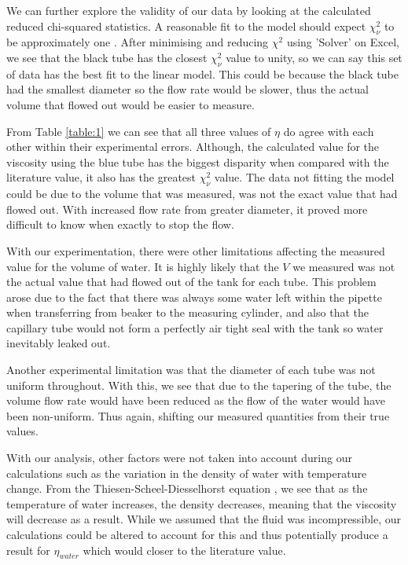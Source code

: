 \documentclass[twocolumn]{revtex4}
\begin{document}
We can further explore the validity of our data by looking at the calculated reduced chi-squared statistics. A reasonable fit to the model should expect $\chi^2_{\nu}$ to be approximately one \cite{hughesandhayes}. After minimising and reducing $\chi^2$ using 'Solver' on Excel, we see that the black tube has the closest $\chi^2_{\nu}$ value to unity, so we can say this set of data has the best fit to the linear model. This could be because the black tube had the smallest diameter so the flow rate would be slower, thus the actual volume that flowed out would be easier to measure.

From Table \ref{table:1} we can see that all three values of $\eta$ do agree with each other within their experimental errors. Although, the calculated value for the viscosity using the blue tube has the biggest disparity when compared with the literature value, it also has the greatest $\chi^2_{\nu}$ value. The data not fitting the model could be due to the volume that was measured, was not the exact value that had flowed out. With increased flow rate from greater diameter, it proved more difficult to know when exactly to stop the flow.

With our experimentation, there were other limitations affecting the measured value for the volume of water. It is highly likely that the $V$ we measured was not the actual value that had flowed out of the tank for each tube. This problem arose due to the fact that there was always some water left within the pipette when transferring from beaker to the measuring cylinder, and also that the capillary tube would not form a perfectly air tight seal with the tank so water inevitably leaked out.

Another experimental limitation was that the diameter of each tube was not uniform throughout. With this, we see that due to the tapering of the tube, the volume flow rate would have been reduced as the flow of the water would have been non-uniform. Thus again, shifting our measured quantities from their true values.

With our analysis, other factors were not taken into account during our calculations such as the variation in the density of water with temperature change. From the Thiesen-Scheel-Diesselhorst equation \cite{dentemp}, we see that as the temperature of water increases, the density decreases, meaning that the viscosity will decrease as a result. While we assumed that the fluid was incompressible, our calculations could be altered to account for this and thus potentially produce a result for $\eta_{water}$ which would closer to the literature value.
\end{document}
